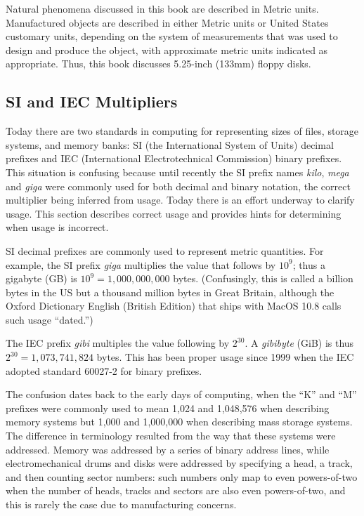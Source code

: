 Natural phenomena discussed in this book are described in Metric
units. Manufactured objects are described in either Metric units or
United States customary units, depending on the system of measurements
that was used to design and produce the object, with approximate
metric units indicated as appropriate. Thus, this book
discusses 5.25-inch (133mm) floppy disks.

\subsection{SI and IEC Multipliers}\label{sec:si-and-iec}

Today there are two standards in computing for representing sizes of
files, storage systems, and memory banks: SI (the International System
of Units) decimal prefixes and IEC (International Electrotechnical
Commission) binary prefixes. This situation is confusing because until
recently the SI prefix names \emph{kilo}, \emph{mega} and \emph{giga} were commonly used
for both decimal and binary notation, the correct multiplier being
inferred from usage. Today there is an effort underway to clarify
usage. This section describes correct usage and provides hints for
determining when usage is incorrect.

SI decimal prefixes are commonly used to represent metric
quantities. For example, the SI prefix \emph{giga} multiplies the value that follows by
$10^9$; thus a gigabyte (GB) is
$10^9=1,000,000,000$ bytes. (Confusingly, this is called a billion bytes
in the US but a thousand million bytes in Great Britain, although the
Oxford Dictionary English (British Edition) that ships with MacOS 10.8
calls such usage ``dated.'')

The IEC prefix \emph{gibi} multiples the value following by $2^{30}$. A \emph{gibibyte}
(GiB) is thus $2^{30}=1,073,741,824$ bytes. This has been proper usage
since 1999 when the IEC adopted standard 60027-2 for binary prefixes.

The confusion dates back to the early days of computing, when the ``K''
and ``M'' prefixes were commonly used to mean 1,024 and 1,048,576
when describing memory systems but 1,000 and 1,000,000 when
describing mass storage systems. The difference in terminology resulted
from the way that these systems were addressed. Memory was addressed
by a series of binary address lines, while electromechanical drums and
disks were addressed by specifying a head, a track, and then counting
sector numbers: such numbers only map to even powers-of-two when the
number of heads, tracks and sectors are also even powers-of-two, and
this is rarely the case due to manufacturing concerns.

